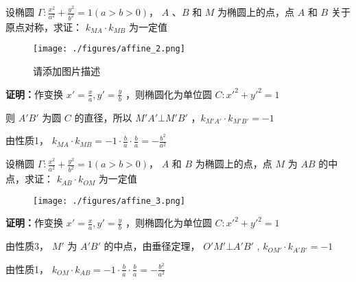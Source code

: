 \begin{corollary}{}
设椭圆 \(\Gamma:\frac{x^2}{a^2}+\frac{y^2}{b^2}=1(a>b>0)\)， \(A\) 、\(B\) 和 \(M\) 为椭圆上的点，点 \(A\) 和 \(B\) 关于原点对称，求证： \(k_{MA}\cdot k_{MB}\) 为一定值
​
\begin{figure}[ht]
\centering
\texttt{[image: ./figures/affine\_2.png]}
\caption{请添加图片描述} \label{affine_fig2}
\end{figure}

\textbf{证明：}作变换 \(x'=\frac{x}{a},y'=\frac{y}{b}\) ，则椭圆化为单位圆 \(C:x'^2+y'^2=1\)

则 \(A'B'\) 为圆 \(C\) 的直径，所以 \(M'A'\bot M'B'\) ，\(k_{M'A'}\cdot k_{M'B'}=-1\)

由性质1， \(k_{MA}\cdot k_{MB}=-1\cdot \frac{b}{a}\cdot \frac{b}{a}=-\frac{b^2}{a^2}\)

\end{corollary}

\begin{corollary}{}
设椭圆 \(\Gamma:\frac{x^2}{a^2}+\frac{y^2}{b^2}=1(a>b>0)\)， \(A\) 和 \(B\) 为椭圆上的点，点 \(M\) 为 \(AB\) 的中点，求证： \(k_{AB}\cdot k_{OM}\) 为一定值

\begin{figure}[ht]
\centering
\texttt{[image: ./figures/affine\_3.png]}
\caption{} \label{affine_fig3}
\end{figure}

\textbf{证明：}作变换 \(x'=\frac{x}{a},y'=\frac{y}{b}\) ，则椭圆化为单位圆 \(C:x'^2+y'^2=1\)

由性质3， \(M'\) 为 \(A'B'\) 的中点，由垂径定理， \(O'M'\bot A'B'\) , \(k_{OM'}\cdot k_{A'B'}=-1\)

由性质1， \(k_{OM}\cdot k_{AB}=-1\cdot \frac{b}{a}\cdot \frac{b}{a}=-\frac{b^2}{a^2}\)

\end{corollary} 

